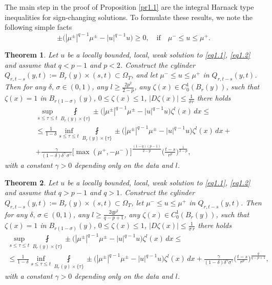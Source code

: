 \documentclass[a4paper,11pt,fullpage]{article}
\numberwithin{equation}{section}
\newtheorem{theorem}{Theorem}[section]
\begin{document}
The main step in the proof of Proposition \ref{pr1.1}  are the integral Harnack type inequalities for sign-changing solutions. To formulate these results, we note the following simple facts
$$\pm\big(|\mu^{\pm}|^{q-1}\mu^{\pm}-|u|^{q-1}u\big)\geqslant 0,\quad \text{if}\quad \mu^-\leqslant u\leqslant \mu^+.$$
\begin{theorem}\label{th1.2}
Let $u$ be a  locally bounded, local, weak solution to \eqref{eq1.1}, \eqref{eq1.2} and assume that $q<p-1$ and $p< 2$. Construct the cylinder
$Q_{r, t-s}(y, t):=B_{r}(y)\times (s, t) \subset \Omega_T$, and let $\mu^-\leqslant u \leqslant \mu^+$ in $Q_{r, t-s}(y, t)$. Then for any 
$\delta,\,\sigma \in (0, 1)$, any $l\geqslant \frac{2 p^2}{2-p}$, any $\zeta(x)\in C^1_0(B_{r}(y))$, such that $\zeta(x)=1$ in $B_{r(1-\sigma)}(y)$, $0\leqslant \zeta(x)\leqslant 1$, $|D \zeta(x)|\leqslant \frac{1}{\sigma r}$ there holds
\begin{multline}\label{eq1.8}
\sup\limits_{s\leqslant \tau\leqslant  t}\fint\limits_{B_{r}(y)\times\{\tau\}}\pm\big(|\mu^{\pm}|^{q-1}\mu^{\pm}-|u|^{q-1}u\big)\zeta^l(x)\,dx \leqslant \\\leqslant \frac{1}{1-\delta} \inf\limits_{s\leqslant\tau \leqslant t}\fint\limits_{B_{r}(y)\times\{\tau\}}\pm\big(|\mu^{\pm}|^{q-1}\mu^{\pm}-|u|^{q-1}u\big)\zeta^l(x)\,dx+\\+\frac{\gamma}
{(1-\delta)\delta^\gamma\,\sigma^\gamma}
\big[\max(\mu^+, -\mu^-)\big]^{\frac{(1-q)(p-1)}{2-p}}
\Big(\frac{t-s}{r^p}\Big)^{\frac{1}{2-p}},
\end{multline}
with a constant $\gamma >0$ depending only on the data and $l$.
\end{theorem}
\begin{theorem}\label{th1.3}
Let $u$ be a  locally bounded, local, weak solution to \eqref{eq1.1}, \eqref{eq1.2} and assume that $q> p-1$ and $q>1$. Construct the cylinder
$Q_{r, t-s}(y, t):=B_{r}(y)\times (s, t) \subset \Omega_T$, let $\mu^-\leqslant u \leqslant \mu^+$ in $Q_{r, t-s}(y, t)$.  
Then for any 
$\delta,\,\sigma \in (0, 1)$, any $l\geqslant \frac{2 q p^2}{q-p+1}$, any $\zeta(x)\in C^1_0(B_{r}(y))$, such that $\zeta(x)=1$ in $B_{r(1-\sigma)}(y)$, $0\leqslant \zeta(x)\leqslant 1$, $|D \zeta(x)|\leqslant \frac{1}{\sigma\,r}$ there holds
\begin{multline}\label{eq1.9}
\sup\limits_{s\leqslant \tau\leqslant t}\fint\limits_{B_{r}(y)\times\{\tau\}}\pm\big(|\mu^{\pm}|^{q-1}\mu^{\pm}-|u|^{q-1}u\big)\zeta^l(x)\, dx \leqslant\\\leqslant \frac{1}{1-\delta}
\inf\limits_{s\leqslant\tau\leqslant t}\fint\limits_{B_{r}(y)\times\{\tau\}} \pm\big(|\mu^{\pm}|^{q-1}\mu^{\pm}-|u|^{q-1}u\big)\zeta^l(x)\,dx +\frac{\gamma}{(1-\delta)\delta^\gamma \sigma^\gamma}
\Big(\frac{t-s}{r^{p}}\Big)^{\frac{q}{q-p+1}},
\end{multline}
with a constant $\gamma >0$ depending only on the data and $l$.
\end{theorem}
\end{document}
